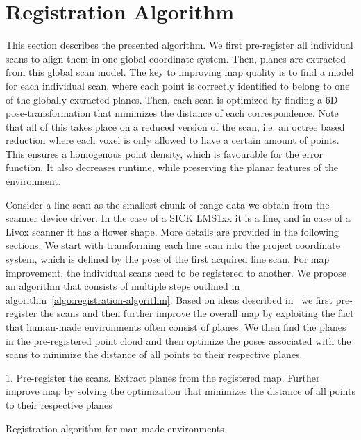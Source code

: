 \section{Registration Algorithm}

This section describes the presented algorithm.
We first pre-register all individual scans to align them in one global coordinate system.
Then, planes are extracted from this global scan model.
The key to improving map quality is to find a model for each individual scan, where each point is correctly identified to belong to one of the globally extracted planes.
Then, each scan is optimized by finding a 6D pose-transformation that minimizes the distance of each correspondence.
Note that all of this takes place on a reduced version of the scan, i.e. an octree based reduction where each voxel is only allowed to have a certain amount of points.
This ensures a homogenous point density, which is favourable for the error function.
It also decreases runtime, while preserving the planar features of the environment. 
 
Consider a line scan as the smallest chunk of range data we obtain from the scanner device driver.
In the case of a SICK LMS1xx it is a line, and in case of a Livox scanner it has a flower shape.
More details are provided in the following sections.
We start with transforming each line scan into the project coordinate system, which is defined by the pose of the first acquired line scan.
%
For map improvement, the individual scans need to be registered to another. 
We propose an algorithm that consists of multiple steps outlined in algorithm~\ref{algo:registration-algorithm}. 
Based on ideas described in~\cite{Borrmann2010} we first pre-register the scans and then further improve the overall map by exploiting the fact that human-made environments often consist of planes. 
We then find the planes in the pre-registered point cloud and then optimize the poses associated with the scans to minimize the distance of all points to their respective planes. 

\begin{algorithm}
    \SetAlgoLined
    1. Pre-register the scans. Extract planes from the registered map. Further improve map by solving the optimization that minimizes the distance of all points to their respective planes\;
    \caption{Registration algorithm for man-made environments}
    \label{algo:registration-algorithm}
\end{algorithm}

